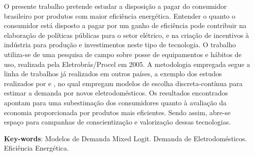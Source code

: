 \documentclass[
	12pt,				%
	openright,			%
	oneside,			%
	a4paper,			%
	english,			%
	french,				%
	spanish,			%
	brazil,				%
	]{abntex2}
\begin{document}
	\begin{resumo}   %
		O  presente trabalho pretende estudar a disposição a pagar do consumidor brasileiro por produtos com maior eficiência energética. Entender o quanto o consumidor está disposto a pagar por um ganho de eficiência pode contribuir na elaboração de políticas públicas  para o setor elétrico, e na criação de incentivos à indústria para produção e investimentos neste tipo de tecnologia. O trabalho utiliza-se de uma pesquisa de campo sobre posse de equipamentos e hábitos de uso, realizada pela Eletrobrás/Procel em 2005. A metodologia empregada segue a linha de trabalhos já realizados em outros países, a exemplo dos estudos realizados por  e , no qual empregam modelos de escolha discreta-contínua para estimar a demanda por novos eletrodomésticos. Os resultados encontrados apontam para uma subestimação dos consumidores quanto à avaliação da economia proporcionada por produtos mais eficientes. Sendo assim, abre-se espaço para campanhas de conscientização e valorização dessas tecnologias.

		\vspace{\onelineskip}

		\noindent
		\textbf{Key-words}: Modelos de Demanda Mixed Logit. Demanda de Eletrodomésticos. Eficiência Energética.
	\end{resumo}
\end{document}

